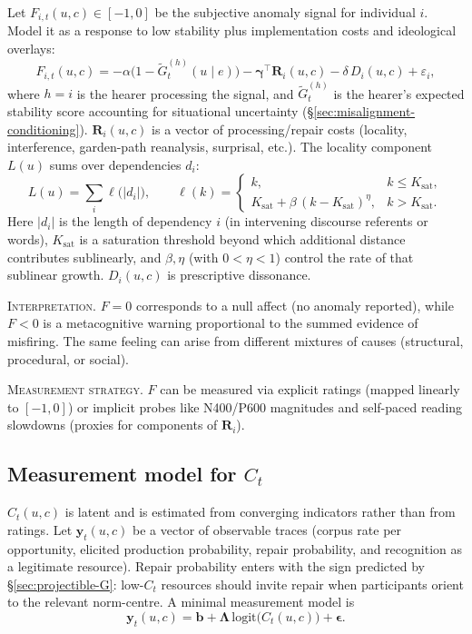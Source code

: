 \documentclass[12pt,letterpaper]{article}
\begin{document}
Let $F_{i,t}(u,c)\in[-1,0]$ be the subjective anomaly signal for individual $i$.
Model it as a response to low stability plus implementation costs and ideological overlays:
\begin{equation*}
F_{i,t}(u,c)=
-\alpha\bigl(1-\widetilde{G}^{(h)}_t(u\mid e)\bigr)
-\mathbf{\gamma}^{\top}\mathbf{R}_{i}(u,c)
-\delta\,D_i(u,c)
+\varepsilon_i,
\end{equation*}
where $h=i$ is the hearer processing the signal, and $\widetilde{G}^{(h)}_t$ is the hearer's expected stability score accounting for situational uncertainty (\S\ref{sec:misalignment-conditioning}).
$\mathbf{R}_{i}(u,c)$ is a vector of processing/repair costs (locality, interference,
garden-path reanalysis, surprisal, etc.). The locality component $L(u)$ sums over dependencies $d_i$:
\begin{equation*}
L(u)=\sum_{i}\ell\!\bigl(|d_i|\bigr),\qquad
\ell(k)=
  \begin{cases}
    k, & k\le K_{\text{sat}},\\[4pt]
    K_{\text{sat}}+\beta\,(k-K_{\text{sat}})^{\eta}, & k>K_{\text{sat}}.
  \end{cases}
\end{equation*}
Here $|d_i|$ is the length of dependency $i$ (in intervening discourse referents or words), $K_{\text{sat}}$ is a saturation threshold beyond which additional distance contributes sublinearly, and $\beta,\eta$ (with $0<\eta<1$) control the rate of that sublinear growth. $D_i(u,c)$ is prescriptive dissonance.

\textsc{Interpretation.} $F=0$ corresponds to a null affect (no anomaly reported), while $F<0$ is a metacognitive warning proportional to the summed evidence of misfiring. The same feeling can arise from different mixtures of causes (structural, procedural, or social).

\textsc{Measurement strategy.} $F$ can be measured via explicit ratings (mapped linearly to $[-1,0]$) or implicit probes like N400/P600 magnitudes and self-paced reading slowdowns (proxies for components of $\mathbf{R}_i$).

\subsection[Measurement model for C]{Measurement model for $C_t$}
\label{sec:measurement-C}

$C_t(u,c)$ is latent and is estimated from converging indicators rather than from ratings.
Let $\mathbf{y}_t(u,c)$ be a vector of observable traces (corpus rate per opportunity,
elicited production probability, repair probability, and recognition as a legitimate
resource). Repair probability enters with the sign predicted by
\S\ref{sec:projectible-G}: low-$C_t$ resources should invite repair when
participants orient to the relevant norm-centre.
A minimal measurement model is
\begin{equation*}
\mathbf{y}_t(u,c)=\mathbf{b}+\boldsymbol{\Lambda}\,\mathrm{logit}\!\bigl(C_t(u,c)\bigr)+\boldsymbol{\epsilon}.
\end{equation*}
\end{document}
